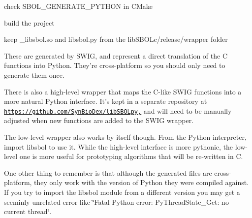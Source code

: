 \begin{DoxyItemize}
\item check S\+B\+O\+L\+\_\+\+G\+E\+N\+E\+R\+A\+T\+E\+\_\+\+P\+Y\+T\+H\+O\+N in C\+Make
\item build the project
\item keep \+\_\+libsbol.\+so and libsbol.\+py from the lib\+S\+B\+O\+Lc/release/wrapper folder
\end{DoxyItemize}

These are generated by S\+W\+I\+G, and represent a direct translation of the C functions into Python. They're cross-\/platform so you should only need to generate them once.

There is also a high-\/level wrapper that maps the C-\/like S\+W\+I\+G functions into a more natural Python interface. It's kept in a separate repository at \href{https://github.com/SynBioDex/libSBOLpy,}{\tt https\+://github.\+com/\+Syn\+Bio\+Dex/lib\+S\+B\+O\+Lpy,} and will need to be manually adjusted when new functions are added to the S\+W\+I\+G wrapper.

The low-\/level wrapper also works by itself though. From the Python interpreter, import libsbol to use it. While the high-\/level interface is more pythonic, the low-\/level one is more useful for prototyping algorithms that will be re-\/written in C.

One other thing to remember is that although the generated files are cross-\/platform, they only work with the version of Python they were compiled against. If you try to import the libsbol module from a different version you may get a seeminly unrelated error like \char`\"{}\+Fatal Python error\+: Py\+Thread\+State\+\_\+\+Get\+: no current thread\char`\"{}. 